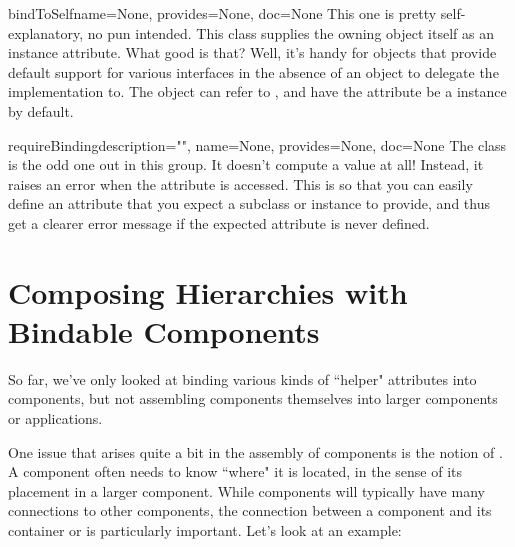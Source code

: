 \begin{verbatim%
}
\begin{verbatim%
}
\begin{verbatim%
}
\begin{verbatim%
}
\begin{verbatim%
}
\begin{verbatim%
}
\begin{verbatim%
}
\begin{verbatim%
}
\begin{verbatim%
}
\begin{funcdesc}{bindToSelf}{name=None, provides=None, doc=None}
This one is pretty self-explanatory, no pun intended.  This class supplies
the owning object itself as an instance attribute.  What good is that?  Well,
it's handy for objects that provide default support for various interfaces
in the absence of an object to delegate the implementation to.  The object
can refer to , and have the
 attribute be a 
instance by default.
\end{funcdesc}

\begin{funcdesc}{requireBinding}{description="", name=None, provides=None,
doc=None}
The  class is the odd one out in this group.
It doesn't compute a value at all!  Instead, it raises an error when the 
attribute is accessed.  This is so that you can easily define an attribute that
you expect a subclass or instance to provide, and thus get a clearer error
message if the expected attribute is never defined.
\end{funcdesc}


\newpage




















\section{Composing Hierarchies with Bindable Components}

So far, we've only looked at binding various kinds of ``helper" attributes
into components, but not assembling components themselves into larger
components or applications.

One issue that arises quite a bit in the assembly of components is the notion
of .  A component often needs to know ``where" it is located,
in the sense of its placement in a larger component.  While components will
typically have many connections to other components, the connection between
a component and its container or  is particularly
important.  Let's look at an example:


\end{verbatim%
}
\end{verbatim%
}
\end{verbatim%
}
\end{verbatim%
}
\end{verbatim%
}
\end{verbatim%
}
\end{verbatim%
}
\end{verbatim%
}
\end{verbatim%
}
